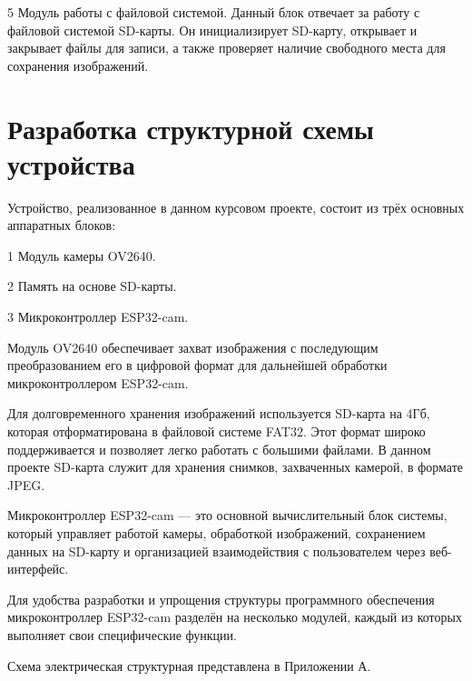    5 Модуль работы с файловой системой.
Данный блок отвечает за работу с файловой системой SD-карты. 
Он инициализирует SD-карту, открывает и закрывает файлы для 
записи, а также проверяет наличие свободного места для 
сохранения изображений.

\section{Разработка структурной схемы устройства}
\hspace*{12.5 mm}Устройство, реализованное в данном курсовом 
проекте, состоит из трёх основных аппаратных блоков:

    1 Модуль камеры OV2640.

    2 Память на основе SD-карты. 

    3 Микроконтроллер ESP32-cam. 
    
    Модуль OV2640 обеспечивает захват изображения с 
последующим преобразованием его в цифровой формат 
для дальнейшей обработки микроконтроллером ESP32-cam.

    Для долговременного хранения 
изображений используется SD-карта на 4Гб, которая отформатирована в 
файловой системе FAT32. Этот формат широко поддерживается и 
позволяет легко работать с большими файлами. В данном проекте 
SD-карта служит для хранения снимков, захваченных камерой, в 
формате JPEG.

    Микроконтроллер ESP32-cam — это основной вычислительный 
блок системы, который управляет работой камеры, обработкой 
изображений, сохранением данных на SD-карту и организацией 
взаимодействия с пользователем через веб-интерфейс.

    Для удобства разработки и упрощения структуры программного 
обеспечения микроконтроллер ESP32-cam разделён на несколько 
модулей, каждый из которых выполняет свои специфические функции.

Схема электрическая структурная представлена в Приложении А.